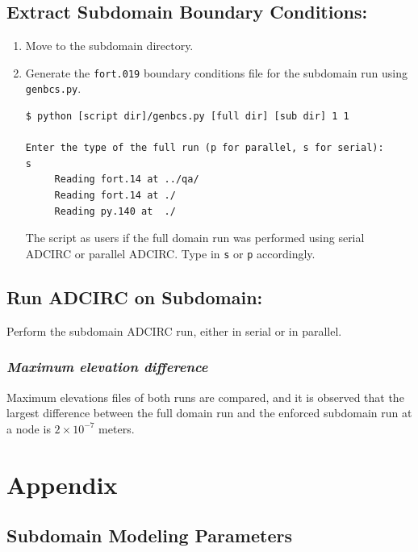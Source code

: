 \documentclass[11pt,titlepage]{article}
\begin{document}
\subsection*{Extract Subdomain Boundary Conditions:}
\begin{enumerate}
\item Move to the subdomain directory.
\item Generate the \verb+fort.019+ boundary conditions file for the
  subdomain run using \verb+genbcs.py+.
\begin{verbatim}
$ python [script dir]/genbcs.py [full dir] [sub dir] 1 1

Enter the type of the full run (p for parallel, s for serial):
s
	 Reading fort.14 at ../qa/
	 Reading fort.14 at ./
	 Reading py.140 at  ./
\end{verbatim}

The script as users if the full domain run was performed using serial ADCIRC or parallel ADCIRC. Type in \verb+s+ or \verb+p+ accordingly.

\end{enumerate}


\subsection*{Run ADCIRC on Subdomain:}

Perform the subdomain ADCIRC run, either in serial or in parallel.



\subsubsection*{\emph{Maximum elevation difference}}

Maximum elevations files of both runs are compared, and it is 
observed that the largest difference between the full domain
run and the enforced subdomain run at a node is $
2 \times 10^{-7}$ meters.






\appendix

\newpage

\section{Appendix}

\subsection{Subdomain Modeling Parameters}
\end{document}
